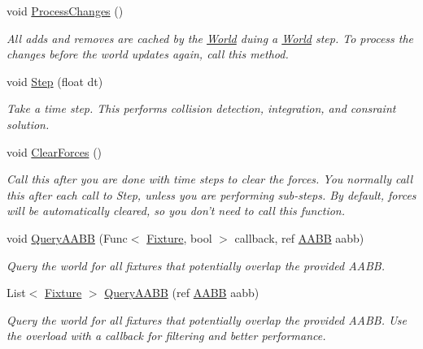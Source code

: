 \begin{DoxyCompactItemize}
void \hyperlink{class_farseer_physics_1_1_dynamics_1_1_world_af88d7180b9bd63fba9ea4af340b27492}{Process\+Changes} ()
\begin{DoxyCompactList}\small\item\em All adds and removes are cached by the \hyperlink{class_farseer_physics_1_1_dynamics_1_1_world}{World} duing a \hyperlink{class_farseer_physics_1_1_dynamics_1_1_world}{World} step. To process the changes before the world updates again, call this method. \end{DoxyCompactList}\item 
void \hyperlink{class_farseer_physics_1_1_dynamics_1_1_world_ae9fd3859184555ee6a6f00b2f8ac6a67}{Step} (float dt)
\begin{DoxyCompactList}\small\item\em Take a time step. This performs collision detection, integration, and consraint solution. \end{DoxyCompactList}\item 
void \hyperlink{class_farseer_physics_1_1_dynamics_1_1_world_a12dfbac25a081efbbe20fb6ab3b6c470}{Clear\+Forces} ()
\begin{DoxyCompactList}\small\item\em Call this after you are done with time steps to clear the forces. You normally call this after each call to Step, unless you are performing sub-\/steps. By default, forces will be automatically cleared, so you don't need to call this function. \end{DoxyCompactList}\item 
void \hyperlink{class_farseer_physics_1_1_dynamics_1_1_world_ab3331be0043529ce54abd6a0e51fc6c6}{Query\+A\+A\+B\+B} (Func$<$ \hyperlink{class_farseer_physics_1_1_dynamics_1_1_fixture}{Fixture}, bool $>$ callback, ref \hyperlink{struct_farseer_physics_1_1_collision_1_1_a_a_b_b}{A\+A\+B\+B} aabb)
\begin{DoxyCompactList}\small\item\em Query the world for all fixtures that potentially overlap the provided A\+A\+B\+B. \end{DoxyCompactList}\item 
List$<$ \hyperlink{class_farseer_physics_1_1_dynamics_1_1_fixture}{Fixture} $>$ \hyperlink{class_farseer_physics_1_1_dynamics_1_1_world_abf5b250824cf186835f060e7e320804a}{Query\+A\+A\+B\+B} (ref \hyperlink{struct_farseer_physics_1_1_collision_1_1_a_a_b_b}{A\+A\+B\+B} aabb)
\begin{DoxyCompactList}\small\item\em Query the world for all fixtures that potentially overlap the provided A\+A\+B\+B. Use the overload with a callback for filtering and better performance. \end{DoxyCompactList}\item 

\end{DoxyCompactItemize}
